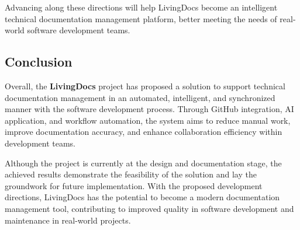 Advancing along these directions will help LivingDocs become an intelligent technical documentation management platform, better meeting the needs of real-world software development teams.

\subsection{Conclusion}
Overall, the \textbf{LivingDocs} project has proposed a solution to support technical documentation management in an automated, intelligent, and synchronized manner with the software development process. Through GitHub integration, AI application, and workflow automation, the system aims to reduce manual work, improve documentation accuracy, and enhance collaboration efficiency within development teams.

Although the project is currently at the design and documentation stage, the achieved results demonstrate the feasibility of the solution and lay the groundwork for future implementation. With the proposed development directions, LivingDocs has the potential to become a modern documentation management tool, contributing to improved quality in software development and maintenance in real-world projects.
